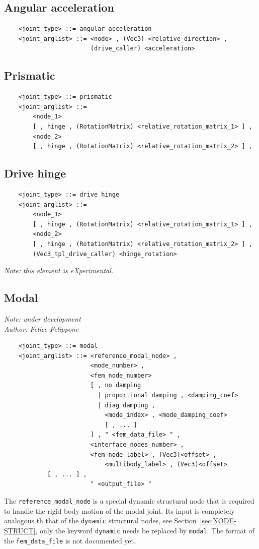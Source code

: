 \subsection{Angular acceleration}
\begin{verbatim}
    <joint_type> ::= angular acceleration
    <joint_arglist> ::= <node> , (Vec3) <relative_direction> , 
                        (drive_caller) <acceleration>
\end{verbatim}

\subsection{Prismatic}
\begin{verbatim}
    <joint_type> ::= prismatic
    <joint_arglist> ::= 
        <node_1>
        [ , hinge , (RotationMatrix) <relative_rotation_matrix_1> ] ,
        <node_2> 
        [ , hinge , (RotationMatrix) <relative_rotation_matrix_2> ] ,    
\end{verbatim}

\subsection{Drive hinge}
\begin{verbatim}
    <joint_type> ::= drive hinge
    <joint_arglist> ::= 
        <node_1>
        [ , hinge , (RotationMatrix) <relative_rotation_matrix_1> ] ,
        <node_2> 
        [ , hinge , (RotationMatrix) <relative_rotation_matrix_2> ] ,
        (Vec3_tpl_drive_caller) <hinge_rotation>
\end{verbatim}
{\em
    Note: this element is eXperimental. 
}
  
\subsection{Modal}\label{ELEMS-JOINT-MODAL}
{\em 
    Note: under development \\
    Author: Felice Felippone
}
\begin{verbatim}
    <joint_type> ::= modal
    <joint_arglist> ::= <reference_modal_node> ,
                        <mode_number> ,
                        <fem_node_number> 
                        [ , no damping 
                          | proportional damping , <damping_coef>
                          | diag damping , 
                            <mode_index> , <mode_damping_coef> 
                            [ , ... ] 
                        ] , " <fem_data_file> " ,
                        <interface_nodes_number> ,
                        <fem_node_label> , (Vec3)<offset> ,
                            <multibody_label> , (Vec3)<offset>
			[ , ... ] ,
                        " <output_file> "
\end{verbatim}
The \texttt{reference\_modal\_node} is a special dynamic structural node that
is required to handle the rigid body motion of the modal joint.
Its input is completely analogous th that of the \texttt{dynamic} structural
nodes, see Section~\ref{sec:NODE-STRUCT}, only the keyword \texttt{dynamic} 
needs be replaced by \texttt{modal}.
The format of the \texttt{fem\_data\_file} is not documented yet.





